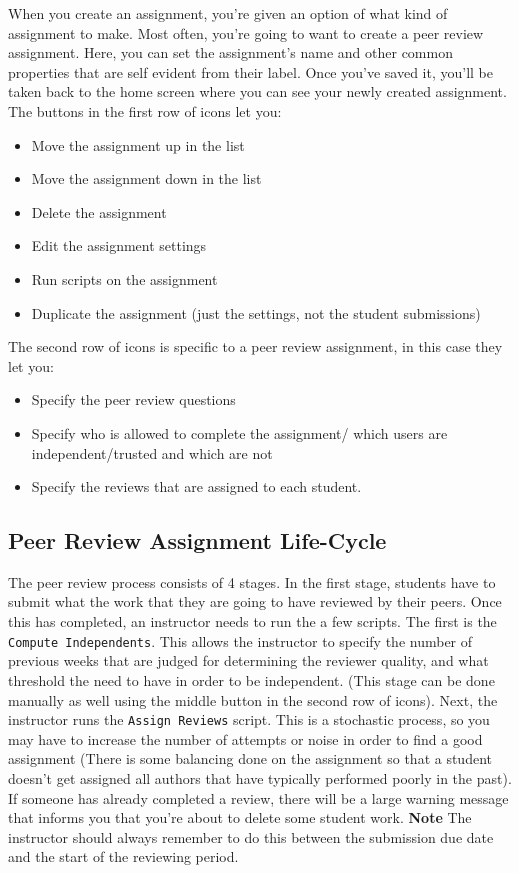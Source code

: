 \documentclass[11pt,letterpaper,oneside]{article}
\begin{document}
When you create an assignment,  you're given an option of what kind of assignment to make. Most often,  you're going to want to create a peer review assignment. Here,  you can set the assignment's name and other common properties that are self evident from their label. Once you've saved it,  you'll be taken back to the home screen where you can see your newly created assignment. The buttons in the first row of icons let you:
\begin{itemize}
  \item Move the assignment up in the list
  \item Move the assignment down in the list
  \item Delete the assignment
  \item Edit the assignment settings
  \item Run scripts on the assignment
  \item Duplicate the assignment (just the settings,  not the student submissions)
\end{itemize}

The second row of icons is specific to a peer review assignment,  in this case they let you:
\begin{itemize}
  \item Specify the peer review questions
  \item Specify who is allowed to complete the assignment/ which users are independent/trusted and which are not
  \item Specify the reviews that are assigned to each student.
\end{itemize}

\subsection{Peer Review Assignment Life-Cycle}

The peer review process consists of 4 stages. In the first stage, students have to submit what the work that they are going to have reviewed by their peers. Once this has completed, an instructor needs to run the a few scripts. The first is the \texttt{Compute Independents}. This allows the instructor to specify the number of previous weeks that are judged for determining the reviewer quality,  and what threshold the need to have in order to be independent. (This stage can be done manually as well using the middle button in the second row of icons). Next,  the instructor runs the \texttt{Assign Reviews} script. This is a stochastic process, so you may have to increase the number of attempts or noise in order to find a good assignment (There is some balancing done on the assignment so that a student doesn't get assigned all authors that have typically performed poorly in the past). If someone has already completed a review,  there will be a large warning message that informs you that you're about to delete some student work. \textbf{Note} The instructor should always remember to do this between the submission due date and the start of the reviewing period. 
\end{document}
